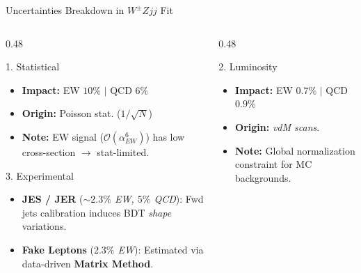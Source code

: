 \documentclass{beamer}
\begin{document}
\begin{frame}[noframenumbering]{Uncertainties Breakdown in $W^\pm Zjj$ Fit}
    \vspace{-2mm}
    
    \begin{columns}[T]
        \begin{column}{0.48\textwidth}
            
            \begin{block}{1. Statistical}
                \begin{itemize}
                    \item \textbf{Impact:} EW $10\%$ $|$ QCD $6\%$
                    \item \textbf{Origin:} Poisson stat. ($1/\sqrt{N}$)
                    \item \textbf{Note:} EW signal ($\mathcal{O}(\alpha_{EW}^6)$) has low cross-section $\rightarrow$ stat-limited.
                \end{itemize}
            \end{block}
                        
            \begin{block}{3. Experimental}
                \begin{itemize}
                    \item \textbf{JES / JER} (\textit{$\sim 2.3\%$ EW, $5\%$ QCD}): Fwd jets calibration induces BDT \textit{shape} variations.
                    \item \textbf{Fake Leptons} (\textit{$2.3\%$ EW}): Estimated via data-driven \textbf{Matrix Method}.
                \end{itemize}
            \end{block}
            
        \end{column}
        
        \begin{column}{0.48\textwidth}
            
            \begin{block}{2. Luminosity}
                \begin{itemize}
                    \item \textbf{Impact:} EW $0.7\%$ $|$ QCD $0.9\%$
                    \item \textbf{Origin:} \textit{vdM scans}.
                    \item \textbf{Note:} Global normalization constraint for MC backgrounds.
                \end{itemize}
            \end{block}
                        

\end{column}
\end{columns}
\end{frame}
\end{document}
